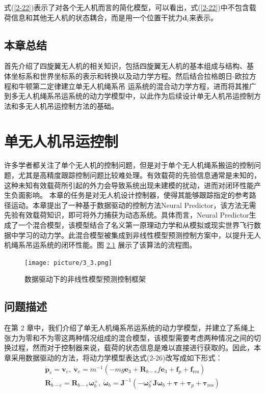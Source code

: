 \documentclass[lang=chs, degree=master, blindreview=false, winfonts=true]{yanputhesis}
\begin{document}
式(\ref{2-22})表示了对各个无人机而言的简化模型，可以看出，式(\ref{2-22})中不包含载荷信息和其他无人机的状态耦合，而是用一个位置干扰力$\boldsymbol{d}_{i}$来表示。

\section{本章总结}
首先介绍了四旋翼无人机的相关知识，包括四旋翼无人机的基本组成与结构、基
体坐标系和世界坐标系的表示和转换以及动力学方程。然后结合拉格朗日-欧拉方程和牛顿第二定律建立单无人机绳系吊
运系统的混合动力学方程，进而将其推广到多无人机绳系吊运系统的动力学模型中，以此作为后续设计单无人机吊运控制方法和多无人机吊运控制方法的基础。
\cleardoublepage

\chapter{单无人机吊运控制}

许多学者都关注了单个无人机的控制问题，但是对于单个无人机绳系搬运的控制问题，尤其是高精度跟踪控制问题比较难处理。有效载荷的先验信息通常是未知的，这种未知有效载荷所引起的外力会导致系统出现未建模的扰动，进而对闭环性能产生负面影响。
本章的任务是对无人机设计控制器，使得其能够跟踪指定的参考路径运动。本章提出了一种基于数据驱动的控制方法Neural Predictor，该方法无需先验有效载荷知识，即可将外力捕获为动态系统。具体而言，Neural Predictor生成了一个混合模型，该模型结合了名义第一原理动力学和从模拟或现实世界飞行数据中学习的动力学。此混合模型被集成到非线性模型预测控制方案中，以提升无人机绳系吊运系统的闭环性能。图 \ref{illustration_framework} 展示了该算法的流程图。


\begin{figure}[hbt!]
	\centering
	\texttt{[image: picture/3\_3.png]} 
	\caption{数据驱动下的非线性模型预测控制框架} 
	\label{illustration_framework}
\end{figure}

\section{问题描述}
在第 2 章中，我们介绍了单无人机绳系吊运系统的动力学模型，并建立了系绳上张力为零和不为零这两种情况组成的混合模型，该模型需要考虑两种情况之间的切换过程，然而对于控制器来说，载荷的状态信息是难以直接进行获取的。因此，本章采用数据驱动的方法，将动力学模型表达式(2-26)改写成如下形式：
\begin{equation}
	\begin{aligned}
		\dot{\boldsymbol{p}}_e = \boldsymbol{v}_e, \
		\dot{\boldsymbol{v}}_e = m^{-1}\left(-mg\bm{e}_3+\boldsymbol{R}_{b-e}f\bm{e}_3+\bm{f}_p+\bm{f}_{\text{res}}\right) \\
		\dot{\bm{R}_{b-e}} = \bm{R}_{b-e} \bm{\omega}_b^{\times}, \
		\dot{\boldsymbol{\omega}}_b = \boldsymbol{J}^{-1}\left(-\bm{\omega}_b^{\times}\bm{J} \bm{\omega}_b+\boldsymbol{\tau}+ \bm{\tau}_p+ \bm{\tau}_{\text{res}}\right)
	\end{aligned}\label{3-1}
\end{equation}
\end{document}
